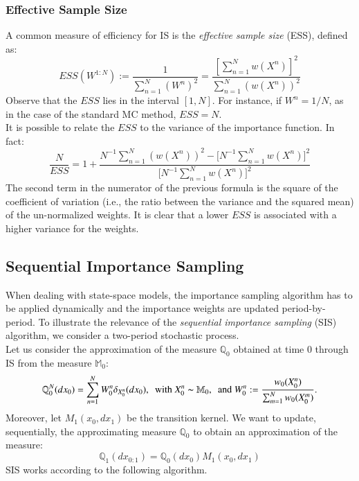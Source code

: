 \documentclass[
]{book}
\theoremstyle{break}
\theoremstyle{nonumberplain}
\begin{document}
\subsubsection{Effective Sample Size}

A common measure of efficiency for IS is the
\textit{effective sample size} (ESS), defined as: \begin{equation*}
    ESS(W^{1:N}):=\frac{1}{\sum_{n=1}^N(W^n)^2}=\frac{[\sum_{n=1}^N w(X^n)]^2}{\sum_{n=1}^N(w(X^n))^2}
\end{equation*} Observe that the \(ESS\) lies in the interval \([1,N]\).
For instance, if \(W^n=1/N\), as in the case of the standard MC method,
\(ESS=N\).\\
It is possible to relate the \(ESS\) to the variance of the importance
function. In fact: \begin{equation*}
    \frac{N}{ESS}=1+\frac{N^{-1}\sum_{n=1}^N(w(X^n))^2-\big[N^{-1}\sum_{n=1}^N w(X^n)\big]^2}{\big[N^{-1}\sum_{n=1}^N w(X^n)\big]^2}
\end{equation*} The second term in the numerator of the previous formula
is the square of the coefficient of variation (i.e., the ratio between
the variance and the squared mean) of the un-normalized weights. It is
clear that a lower \(ESS\) is associated with a higher variance for the
weights.

\subsection{Sequential Importance Sampling}\label{seq_impt_sampling}

When dealing with state-space models, the importance sampling algorithm
has to be applied dynamically and the importance weights are updated
period-by-period. To illustrate the relevance of the
\textit{sequential importance sampling} (SIS) algorithm, we consider a
two-period stochastic process.~\\
Let us consider the approximation of the measure \(\mathbb Q_0\)
obtained at time 0 through IS from the measure \(\mathbb M_0\):
\begin{equation*}
    \mathbb Q_0^N(dx_0)=\sum_{n=1}^NW_0^n\delta_{X_0^n}(dx_0),~~\text{with } X_0^n\thicksim \mathbb M_0,~~\text{and }  W_0^n:=\frac{w_0(X_0^n)}{\sum_{m=1}^Nw_0(X_0^m)}.
\end{equation*} Moreover, let \(M_1(x_0,dx_1)\) be the transition
kernel. We want to update, sequentially, the approximating measure
\(\mathbb Q_0\) to obtain an approximation of the measure:
\begin{equation*}
    \mathbb Q_{1}(dx_{0:1})=\mathbb Q_0(dx_0)M_1(x_0,dx_1)
\end{equation*} SIS works according to the following algorithm.
\end{document}

